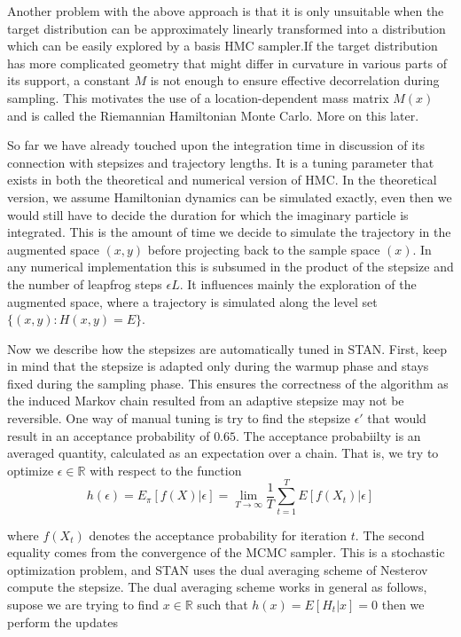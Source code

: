 \documentclass{book}
\begin{document}
\begin{enumerate}
Another problem with the above approach is that it is only unsuitable when the
target distribution can be approximately linearly transformed into a
distribution which can be easily explored by a basis HMC sampler.If the target
distribution has more complicated geometry that might differ in
curvature in various parts of its support, a constant $M$ is not enough to ensure
effective decorrelation during sampling. This motivates the use of
a location-dependent mass matrix $M(x)$ and is called the Riemannian Hamiltonian
Monte Carlo. More on this later. 

So far we have already touched upon the integration time in discussion of
its connection with stepsizes and trajectory lengths. It is a tuning parameter
that exists in both the theoretical and numerical version of HMC. In the
theoretical version, we assume Hamiltonian dynamics can be simulated exactly,
even then we would still have to decide the duration for which the imaginary
particle is integrated. This
is the amount of time we decide to simulate the trajectory in the augmented
space $(x,y)$ before projecting back to the sample space $(x)$. In any
numerical implementation this is subsumed in the product of the stepsize and the
number of leapfrog steps $\epsilon L$. It influences mainly the exploration of
the augmented space, where a trajectory is simulated along the level set
$\{(x,y):H(x,y)=E\}$.

Now we describe how the stepsizes are automatically tuned in STAN. First, keep
in mind that the stepsize is adapted only during the warmup phase and stays
fixed during the sampling phase. This ensures the correctness of the algorithm
as the induced Markov chain resulted from an adaptive stepsize may not be
reversible. One way of manual tuning is try to find the stepsize
$\epsilon'$ that would result in an acceptance probability of $0.65$. The
acceptance probabiilty is an averaged quantity, calculated as an expectation
over a chain. That is, we try to optimize $\epsilon \in \mathbb{R}$ with respect
to the function 
\[ h(\epsilon) = E_\pi[f(X)|\epsilon]  = \lim_{T \rightarrow \infty} \frac{1}{T}
\sum_{t=1}^T E[f(X_t)|\epsilon] \]

where $f(X_t)$ denotes the acceptance probability for iteration $t$. The
second equality comes from the convergence of the MCMC sampler. This is a
stochastic optimization problem, and STAN uses the dual averaging scheme of
Nesterov compute the stepsize. The dual averaging scheme works in general as
follows, supose we are trying to find $x\in \mathbb{R}$ such that $h(x) =
E[H_t|x] = 0$ then we perform the updates 


\end{enumerate}
\end{document}
